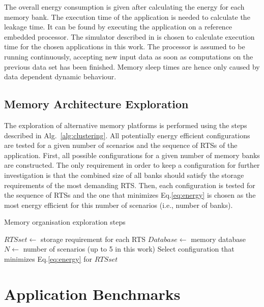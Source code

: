 \documentclass[smallcondensed]{svjour3}
\begin{document}
The overall energy consumption is given after calculating the energy for each memory bank. 
The execution time of the application is needed to calculate the leakage time. 
It can be found by executing the application on a reference embedded processor. 
The simulator described in \cite{Gem5} is chosen to calculate execution time for the chosen applications in this work. 
The processor is assumed to be running continuously, accepting new input data as soon as computations on the previous data set has been finished. 
Memory sleep times are hence only caused by data dependent dynamic behaviour.

\subsection{Memory Architecture Exploration}

The exploration of alternative memory platforms is performed using the steps described in Alg.~\ref{alg:clustering}. 
All potentially energy efficient configurations are tested for a given number of scenarios and the sequence of RTSs of the application. 
First, all possible configurations for a given number of memory banks are constructed. 
The only requirement in order to keep a configuration for further investigation is that the combined size of all banks should satisfy the storage requirements of the most demanding RTS. 
Then, each configuration is tested for the sequence of RTSs and the one that minimizes Eq.\ref{eq:energy} is chosen as the most energy efficient for this number of scenarios (i.e., number of banks). 

\begin{algorithm}
\caption{Memory organisation exploration steps}
 \label{alg:clustering}
 \begin{algorithmic}[1]
		\STATE $RTSset \gets$ storage requirement for each RTS
		\STATE $Database \gets $ memory database
		\STATE $N \gets $ number of scenarios (up to 5 in this work)
				  \ENDIF
				\STATE Select configuration that minimizes Eq.\ref{eq:energy} for $RTSset$			
				\ENDFOR			
			\ENDFOR
 \end{algorithmic}
\end{algorithm}
 
\section{Application Benchmarks}
\label{sec:applications}
\end{document}

